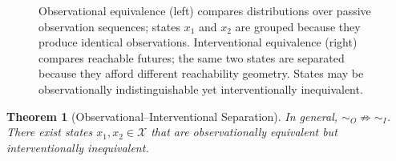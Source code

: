 \documentclass[11pt, a4paper]{article}
\theoremstyle{plain}
\newtheorem{theorem}{Theorem}
\theoremstyle{definition}
\theoremstyle{remark}
\newcommand{\simO}{\sim_O}
\newcommand{\simI}{\sim_I}
\begin{document}
\begin{figure}[t]
\centering
{}
\caption{Observational equivalence (left) compares distributions over
passive observation sequences; states $x_1$ and $x_2$ are grouped because
they produce identical observations. Interventional equivalence (right)
compares reachable futures; the same two states are separated because they
afford different reachability geometry. States may be observationally
indistinguishable yet interventionally inequivalent.}
\label{fig:oi}
\end{figure}

\begin{theorem}[Observational--Interventional Separation]
\label{thm:oi}
In general, $\simO \not\Rightarrow \simI$. There exist states
$x_1, x_2 \in \mathcal{X}$ that are observationally equivalent but
interventionally inequivalent.
\end{theorem}
\end{document}
